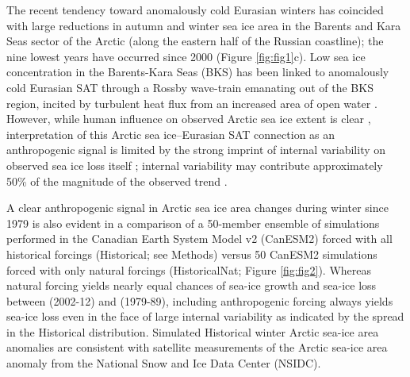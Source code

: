 \documentclass{nature}
\begin{document}

The recent tendency toward anomalously cold Eurasian winters has coincided with large reductions in autumn and winter sea ice area in the Barents and Kara Seas sector of the Arctic (along the eastern half of the Russian coastline); the nine lowest years have occurred since 2000 (Figure \ref{fig:fig1}c). Low sea ice concentration in the Barents-Kara Seas (BKS) has been linked to anomalously cold Eurasian SAT through a Rossby wave-train emanating out of the BKS region, incited by turbulent heat flux from an increased area of open water \cite{honda09,mori14,kim14,peings14}. However, while human influence on observed Arctic sea ice extent is clear \cite{min08}, interpretation of this Arctic sea ice--Eurasian SAT connection as an anthropogenic signal is limited by the strong imprint of internal variability on observed sea ice loss itself \cite{swart15}; internal variability may contribute approximately 50\% of the magnitude of the observed trend \cite{stroeve07,kay11}.

A clear anthropogenic signal in Arctic sea ice area changes during winter since 1979 is also evident in a comparison of a 50-member ensemble of simulations performed in the Canadian Earth System Model v2 (CanESM2) forced with all historical forcings (Historical; see Methods) versus 50 CanESM2 simulations forced with only natural forcings (HistoricalNat; Figure \ref{fig:fig2}). Whereas natural forcing yields nearly equal chances of sea-ice growth and sea-ice loss between (2002-12) and (1979-89), including anthropogenic forcing always yields sea-ice loss even in the face of large internal variability as indicated by the spread in the Historical distribution. Simulated Historical winter Arctic sea-ice area anomalies are consistent with satellite measurements of the Arctic sea-ice area anomaly from the National Snow and Ice Data Center (NSIDC). 



\end{document}
